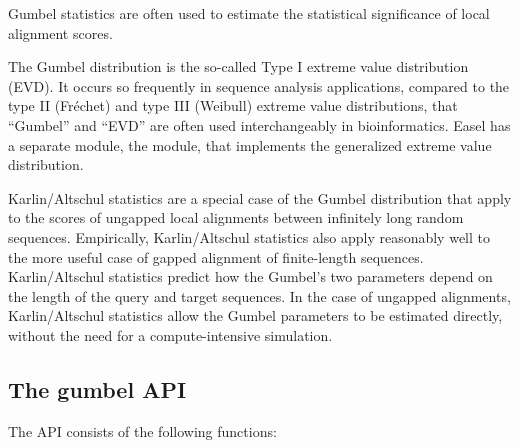 
Gumbel statistics are often used to estimate the statistical
significance of local alignment scores.

The Gumbel distribution is the so-called Type I extreme value
distribution (EVD). It occurs so frequently in sequence analysis
applications, compared to the type II (Fr\'{e}chet) and type III
(Weibull) extreme value distributions, that ``Gumbel'' and ``EVD'' are
often used interchangeably in bioinformatics. Easel has a separate
module, the  module, that implements the generalized
extreme value distribution.

Karlin/Altschul statistics are a special case of the Gumbel
distribution that apply to the scores of ungapped local alignments
between infinitely long random sequences. Empirically, Karlin/Altschul
statistics also apply reasonably well to the more useful case of
gapped alignment of finite-length sequences. Karlin/Altschul
statistics predict how the Gumbel's two parameters depend on the
length of the query and target sequences. In the case of ungapped
alignments, Karlin/Altschul statistics allow the Gumbel parameters to
be estimated directly, without the need for a compute-intensive
simulation.

\subsection{The gumbel API}

The  API consists of the following functions:

